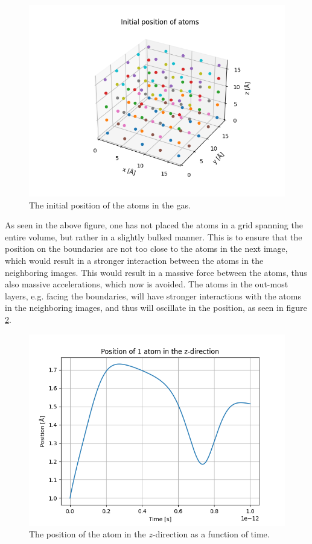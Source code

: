 \documentclass[a4paper]{article}
\begin{document}
\begin{figure}[H]
    \centering
    \includegraphics[scale = 0.5]{initial_position.png}
    \caption{The initial position of the atoms in the gas.}
    \label{fig: initial position gas}
\end{figure}\noindent
As seen in the above figure, one has not placed the atoms in a grid spanning the entire volume, but rather in a slightly bulked manner. This is to ensure that the position on the boundaries are not too close to the atoms in the next image, which would result in a stronger interaction between the atoms in the neighboring images.
This would result in a massive force between the atoms, thus also massive accelerations, which now is avoided.
The atoms in the out-most layers, e.g. facing the boundaries, will have stronger interactions with the atoms in the neighboring images, and thus will oscillate in the position, as seen in figure \ref{fig: z-direction-gas}.
\begin{figure}[H]
    \centering
    \includegraphics[scale = .5]{pos-z_direction.png}
    \caption{The position of the atom in the $z$-direction as a function of time.}
    \label{fig: z-direction-gas}
\end{figure}\noindent
\end{document}
